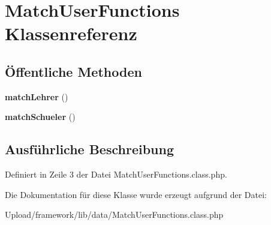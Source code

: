 \hypertarget{class_match_user_functions}{}\section{Match\+User\+Functions Klassenreferenz}
\label{class_match_user_functions}
\subsection*{Öffentliche Methoden}
\begin{DoxyCompactItemize}
\item 
\mbox{\label{class_match_user_functions_ae5e5c2802d0d3bd2d340563f03a58c11}} 
{\bfseries match\+Lehrer} ()
\item 
\mbox{\label{class_match_user_functions_a8ad53b70d1fdd4e475559eb9d08c5700}} 
{\bfseries match\+Schueler} ()
\end{DoxyCompactItemize}


\subsection{Ausführliche Beschreibung}


Definiert in Zeile 3 der Datei Match\+User\+Functions.\+class.\+php.



Die Dokumentation für diese Klasse wurde erzeugt aufgrund der Datei\+:\begin{DoxyCompactItemize}
\item 
Upload/framework/lib/data/Match\+User\+Functions.\+class.\+php\end{DoxyCompactItemize}
